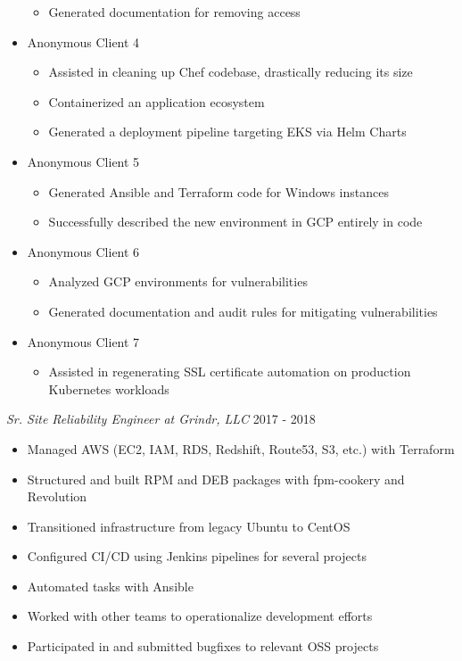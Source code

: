 \documentclass[line]{docs/resume/res}
\begin{document}
\begin{resume}
\begin{itemize}
\begin{itemize}
      \item Generated documentation for removing access
    \end{itemize}
    \item Anonymous Client 4
    \begin{itemize} \itemsep -2pt
      \item Assisted in cleaning up Chef codebase, drastically reducing its size
      \item Containerized an application ecosystem
      \item Generated a deployment pipeline targeting EKS via Helm Charts
    \end{itemize}
    \item Anonymous Client 5
    \begin{itemize} \itemsep -2pt
      \item Generated Ansible and Terraform code for Windows instances
      \item Successfully described the new environment in GCP entirely in code
    \end{itemize}
    \item Anonymous Client 6
    \begin{itemize} \itemsep -2pt
      \item Analyzed GCP environments for vulnerabilities
      \item Generated documentation and audit rules for mitigating vulnerabilities
    \end{itemize}
    \item Anonymous Client 7
    \begin{itemize} \itemsep -2pt
      \item Assisted in regenerating SSL certificate automation on production \\
        Kubernetes workloads
    \end{itemize}
  \end{itemize}

  {\sl Sr. Site Reliability Engineer at Grindr, LLC} \hfill 2017 - 2018
  \begin{itemize} \itemsep -2pt %
    \item Managed AWS (EC2, IAM, RDS, Redshift, Route53, S3, etc.) with Terraform
    \item Structured and built RPM and DEB packages with fpm-cookery and Revolution
    \item Transitioned infrastructure from legacy Ubuntu to CentOS
    \item Configured CI/CD using Jenkins pipelines for several projects
    \item Automated tasks with Ansible
    \item Worked with other teams to operationalize development efforts
    \item Participated in and submitted bugfixes to relevant OSS projects
  \end{itemize}


\end{resume}
\end{document}
